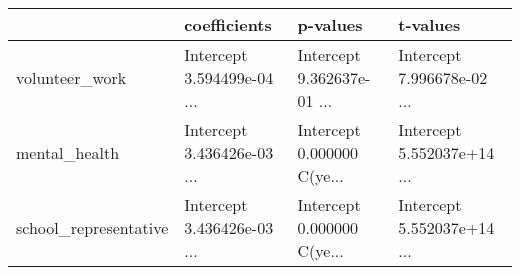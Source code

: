 \begin{tabular}{llll}
\toprule
{} &                                       coefficients &                                           p-values &                                           t-values \\
\midrule
volunteer\_work        &  Intercept                        3.594499e-04
... &  Intercept                        9.362637e-01
... &  Intercept                        7.996678e-02
... \\
mental\_health         &  Intercept                        3.436426e-03
... &  Intercept                        0.000000
C(ye... &  Intercept                        5.552037e+14
... \\
school\_representative &  Intercept                        3.436426e-03
... &  Intercept                        0.000000
C(ye... &  Intercept                        5.552037e+14
... \\
\bottomrule
\end{tabular}
